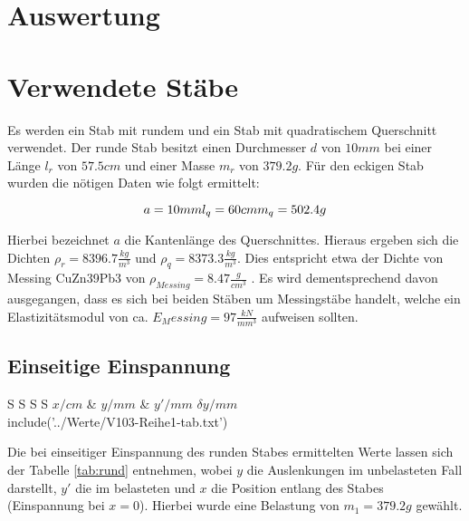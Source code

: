 \section{Auswertung}
\label{sec:Auswertung}

\section{Verwendete Stäbe}
\label{sec:Stäbe}

Es werden ein Stab mit rundem und ein Stab mit quadratischem Querschnitt verwendet. Der runde Stab besitzt einen Durchmesser $d$ von $10mm$ bei einer Länge $l_{r}$ von $57.5cm$ und einer Masse $m_{r}$ von $379.2g$.
Für den eckigen Stab wurden die nötigen Daten wie folgt ermittelt:

\begin{equation*}
  a = 10mm \\
  l_{q} = 60cm \\
  m_{q} = 502.4g \\
\end{equation*}

Hierbei bezeichnet $a$ die Kantenlänge des Querschnittes. Hieraus ergeben sich die Dichten $\rho_{r} = 8396.7\frac{kg}{m^3}$ und $\rho_{q} = 8373.3\frac{kg}{m^3}$. Dies entspricht etwa der Dichte von  Messing CuZn39Pb3 von $\rho_{Messing} = 8.47\frac{g}{cm^3}$ \cite{DKI}. Es wird dementsprechend davon ausgegangen, dass es sich bei beiden Stäben um Messingstäbe handelt, welche ein Elastizitätsmodul von ca. $E_Messing = 97 \frac{kN}{mm^3}$ \cite{DKI} aufweisen sollten.

\subsection{Einseitige Einspannung}
\label{sec:Einseitig}

\begin{table}
  \centering
\caption{Auslenkung des runden Stabes}
\label{tab:rund}
\begin{tabular}{S S S S}
  \toprule
  {$x/cm$} & {$y/mm$} & {$y'/mm$} {$\delta y/mm$}\\
  \midrule
  include('../Werte/V103-Reihe1-tab.txt')
\bottomrule
\end{tabular}
\end{table}
\FloatBarrier

Die bei einseitiger Einspannung des runden Stabes ermittelten Werte lassen sich der Tabelle \ref{tab:rund} entnehmen, wobei $y$ die Auslenkungen im unbelasteten Fall darstellt, $y'$ die im belasteten und $x$ die Position entlang des Stabes (Einspannung bei $x=0$). Hierbei wurde eine Belastung von $m_1 = 379.2g$ gewählt.

